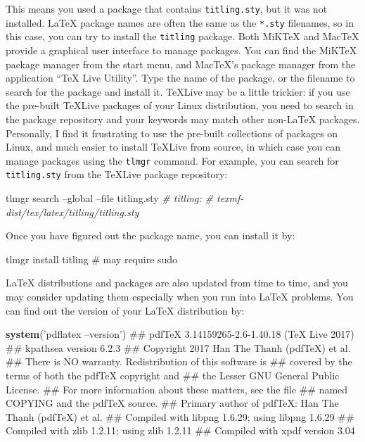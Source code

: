 \documentclass[12pt,]{krantz}
\makeatletter
\newenvironment{Shaded}{\begin{snugshade}}{\end{snugshade}}
\newcommand{\KeywordTok}[1]{\textcolor[rgb]{0.13,0.29,0.53}{\textbf{#1}}}
\newcommand{\StringTok}[1]{\textcolor[rgb]{0.31,0.60,0.02}{#1}}
\newcommand{\CommentTok}[1]{\textcolor[rgb]{0.56,0.35,0.01}{\textit{#1}}}
\newcommand{\ExtensionTok}[1]{#1}
\newcommand{\NormalTok}[1]{#1}
\newenvironment{kframe}{%
\medskip{}
\setlength{\fboxsep}{.8em}
 \def\at@end@of@kframe{}%
 \ifinner\ifhmode%
  \def\at@end@of@kframe{\end{minipage}}%
  \begin{minipage}{\columnwidth}%
 \fi\fi%
 \def\FrameCommand##1{\hskip\@totalleftmargin \hskip-\fboxsep
 \colorbox{shadecolor}{##1}\hskip-\fboxsep
     \hskip-\linewidth \hskip-\@totalleftmargin \hskip\columnwidth}%
 \MakeFramed {\advance\hsize-\width
   \@totalleftmargin\z@ \linewidth\hsize
   \@setminipage}}%
 {\par\unskip\endMakeFramed%
 \at@end@of@kframe}
\renewenvironment{Shaded}{\begin{kframe}}{\end{kframe}}
\theoremstyle{definition}
\theoremstyle{definition}
\theoremstyle{definition}
\theoremstyle{remark}
\makeatother
\begin{document}
This means you used a package that contains \texttt{titling.sty}, but it
was not installed. LaTeX package names are often the same as the
\texttt{*.sty} filenames, so in this case, you can try to install the
\texttt{titling} package. Both MiKTeX and MacTeX provide a graphical
user interface to manage packages. You can find the MiKTeX package
manager from the start menu, and MacTeX's package manager from the
application ``TeX Live Utility''. Type the name of the package, or the
filename to search for the package and install it. TeXLive may be a
little trickier: if you use the pre-built TeXLive packages of your Linux
distribution, you need to search in the package repository and your
keywords may match other non-LaTeX packages. Personally, I find it
frustrating to use the pre-built collections of packages on Linux, and
much easier to install TeXLive from source, in which case you can manage
packages using the \texttt{tlmgr} command. For example, you can search
for \texttt{titling.sty} from the TeXLive package repository:

\begin{Shaded}
\begin{Highlighting}[]
\ExtensionTok{tlmgr}\NormalTok{ search --global --file titling.sty}
\CommentTok{# titling:}
\CommentTok{#    texmf-dist/tex/latex/titling/titling.sty}
\end{Highlighting}
\end{Shaded}

Once you have figured out the package name, you can install it by:

\begin{Shaded}
\begin{Highlighting}[]
\ExtensionTok{tlmgr}\NormalTok{ install titling  # may require sudo}
\end{Highlighting}
\end{Shaded}

LaTeX distributions and packages are also updated from time to time, and
you may consider updating them especially when you run into LaTeX
problems. You can find out the version of your LaTeX distribution by:

\begin{Shaded}
\begin{Highlighting}[]
\KeywordTok{system}\NormalTok{(}\StringTok{'pdflatex --version'}\NormalTok{)}
\NormalTok{## pdfTeX 3.14159265-2.6-1.40.18 (TeX Live 2017)}
\NormalTok{## kpathsea version 6.2.3}
\NormalTok{## Copyright 2017 Han The Thanh (pdfTeX) et al.}
\NormalTok{## There is NO warranty.  Redistribution of this software is}
\NormalTok{## covered by the terms of both the pdfTeX copyright and}
\NormalTok{## the Lesser GNU General Public License.}
\NormalTok{## For more information about these matters, see the file}
\NormalTok{## named COPYING and the pdfTeX source.}
\NormalTok{## Primary author of pdfTeX: Han The Thanh (pdfTeX) et al.}
\NormalTok{## Compiled with libpng 1.6.29; using libpng 1.6.29}
\NormalTok{## Compiled with zlib 1.2.11; using zlib 1.2.11}
\NormalTok{## Compiled with xpdf version 3.04}
\end{Highlighting}
\end{Shaded}



\backmatter
\printindex
\end{document}

